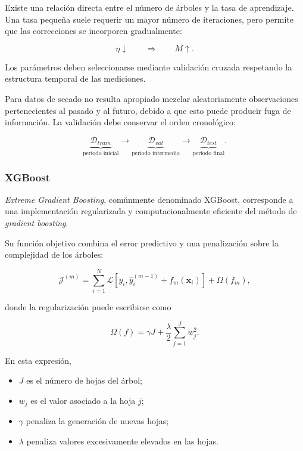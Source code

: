 Existe una relación directa entre el número de árboles y la tasa de aprendizaje. Una tasa pequeña suele requerir un mayor número de iteraciones, pero permite que las correcciones se incorporen gradualmente:

\begin{equation}
\eta\downarrow
\qquad\Longrightarrow\qquad
M\uparrow.
\end{equation}

Los parámetros deben seleccionarse mediante validación cruzada respetando la estructura temporal de las mediciones.

Para datos de secado no resulta apropiado mezclar aleatoriamente observaciones pertenecientes al pasado y al futuro, debido a que esto puede producir fuga de información. La validación debe conservar el orden cronológico:

\begin{equation}
\underbrace{
\mathcal{D}_{train}
}_{\text{periodo inicial}}
\longrightarrow
\underbrace{
\mathcal{D}_{val}
}_{\text{periodo intermedio}}
\longrightarrow
\underbrace{
\mathcal{D}_{test}
}_{\text{periodo final}}.
\end{equation}

\subsubsection{XGBoost}

\textit{Extreme Gradient Boosting}, comúnmente denominado XGBoost, corresponde a una implementación regularizada y computacionalmente eficiente del método de \textit{gradient boosting}.

Su función objetivo combina el error predictivo y una penalización sobre la complejidad de los árboles:

\begin{equation}
\mathcal{J}^{(m)}
=
\sum_{i=1}^{N}
\mathcal{L}
\left[
y_i,
\hat{y}_i^{(m-1)}
+
f_m(\mathbf{x}_i)
\right]
+
\Omega(f_m),
\end{equation}

donde la regularización puede escribirse como

\begin{equation}
\Omega(f)
=
\gamma J
+
\frac{\lambda}{2}
\sum_{j=1}^{J}
w_j^2.
\end{equation}

En esta expresión,

\begin{itemize}
    \item $J$ es el número de hojas del árbol;
    \item $w_j$ es el valor asociado a la hoja $j$;
    \item $\gamma$ penaliza la generación de nuevas hojas;
    \item $\lambda$ penaliza valores excesivamente elevados en las hojas.
\end{itemize}

